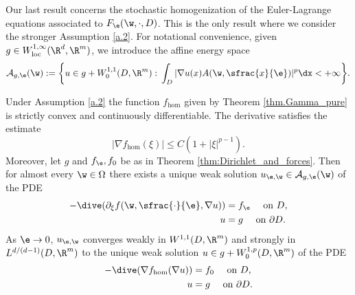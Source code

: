 Our last result concerns the stochastic homogenization of the Euler-Lagrange equations associated to $F_{\e}(\w,\cdot,D)$. This is the only result where we consider the stronger Assumption \ref{a.2}. For notational convenience, given $g\in W^{1,\infty}_\mathrm{loc}(\R^d,\R^m)$, we introduce the affine energy space
\begin{equation*}
\mathcal{A}_{g,\e}(\w):=\biggl\{u\in g+W^{1,1}_0(D,\R^m):\,\int_D|\nabla u(x)A(\w,\sfrac{x}{\e})|^p\dx<+\infty\biggr\}.
\end{equation*}
\begin{theorem}\label{thm.PDEs}
Under Assumption \ref{a.2} the function $f_{\hom}$ given by Theorem \ref{thm.Gamma_pure} is strictly convex and continuously differentiable. The derivative satisfies the estimate
\begin{equation*}
|\nabla f_{\hom}(\xi)|\leq C(1+|\xi|^{p-1}).
\end{equation*}
Moreover, let $g$ and $f_{\e},f_0$ be as in Theorem \ref{thm:Dirichlet_and_forces}. Then for almost every $\w\in\Omega$ there exists a unique weak solution $u_{\e,\w}\in \mathcal{A}_{g,\e}(\w)$ of the PDE
\begin{equation}\label{eq:epsPDE}
\begin{split}-\dive(\partial_{\xi }f(\w,\sfrac{\cdot}{\e},\nabla u))&=f_{\e}\quad\text{ on }D,
\\
u&=g\quad\text{ on }\partial D.
\end{split}
\end{equation}
As $\e\to 0$, $u_{\e,\w}$ converges weakly in $W^{1,1}(D,\R^m)$ and strongly in $L^{d/(d-1)}(D,\R^m)$ to the unique weak solution $u\in g+W^{1,p}_0(D,\R^m)$ of the PDE
\begin{align*}
-\dive(\nabla f_{\hom}(\nabla u))&=f_0\quad\text{ on }D,
\\
u&=g\quad\text{ on }\partial D.
\end{align*}
\end{theorem}
\skpt
